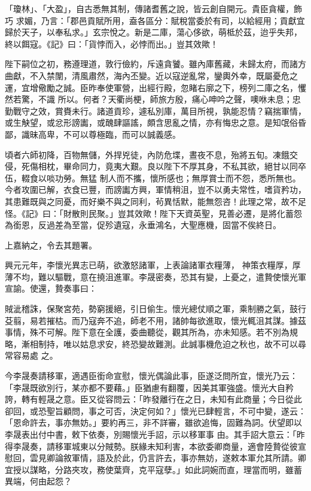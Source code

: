 \begin{pinyinscope}
 「瓊林」、「大盈」，自古悉無其制，傳諸耆舊之說，皆云創自開元。貴臣貪權，飾巧
 求媚，乃言：「郡邑貢賦所用，盍各區分：賦稅當委於有司，以給經用；貢獻宜歸於天子，以奉私求。」玄宗悅之。新是二庫，蕩心侈欲，萌柢於茲，迨乎失邦，終以餌寇。《記》曰：「貨悖而入，必悖而出。」豈其效歟！



 陛下嗣位之初，務遵理道，敦行儉約，斥遠貪饕。雖內庫舊藏，未歸太府，而諸方曲獻，不入禁闈，清風肅然，海內丕變。近以寇逆亂常，鑾輿外幸，既屬憂危之運，宜增儆勵之誠。臣昨奉使軍營，出經行殿，忽睹右廓之下，榜列二庫之名，戄然若驚，不識
 所以。何者？天衢尚梗，師旅方殷，痛心呻吟之聲，噢咻未息；忠勤戰守之效，賞賚未行。諸道貢珍，遽私別庫，萬目所視，孰能忍情？竊揣軍情，或生觖望，或忿形謗讟，或醜肆謳謠，頗含思亂之情，亦有悔忠之意。是知氓俗昏鄙，識昧高卑，不可以尊極臨，而可以誠義感。



 頃者六師初降，百物無儲，外捍兇徒，內防危堞，晝夜不息，殆將五旬。凍餓交侵，死傷相枕，畢命同力，竟夷大艱。良以陛下不厚其身，不私其欲，絕甘以同卒伍，輟食以啖功勞。無猛
 制人而不攜，懷所感也；無厚賞士而不怨，悉所無也。今者攻圍已解，衣食已豐，而謗讟方興，軍情稍沮，豈不以勇夫常性，嗜貨矜功，其患難既與之同憂，而好樂不與之同利，茍異恬默，能無怨咨！此理之常，故不足怪。《記》曰：「財散則民聚。」豈其效歟！陛下天資英聖，見善必遷，是將化蓄怨為銜恩，反過差為至當，促殄遺寇，永垂鴻名，大聖應機，固當不俟終日。



 上嘉納之，令去其題署。



 興元元年，李懷光異志已萌，欲激怒諸軍，上表論諸軍衣糧薄，
 神策衣糧厚，厚薄不均，難以驅戰，意在撓沮進軍。李晟密奏，恐其有變，上憂之，遣贄使懷光軍宣諭。使還，贄奏事曰：



 賊泚稽誅，保聚宮苑，勢窮援絕，引日偷生。懷光總仗順之軍，乘制勝之氣，鼓行芟翦，易若摧枯。而乃寇奔不追，師老不用，諸帥每欲進取，懷光輒沮其謀。據茲事情，殊不可解。陛下意在全護，委曲聽從，觀其所為，亦未知感。若不別為規略，漸相制持，唯以姑息求安，終恐變故難測。此誠事機危迫之秋也，故不可以尋常容易處
 之。



 今李晟奏請移軍，適遇臣銜命宣慰，懷光偶論此事，臣遂泛問所宜，懷光乃云：「李晟既欲別行，某亦都不要藉。」臣猶慮有翻覆，因美其軍強盛。懷光大自矜誇，轉有輕晟之意。臣又從容問云：「昨發離行在之日，未知有此商量；今日從此卻回，或恐聖旨顧問，事之可否，決定何如？」懷光已肆輕言，不可中變，遂云：「恩命許去，事亦無妨。」要約再三，非不詳審，雖欲追悔，固難為詞。伏望即以李晟表出付中書，敕下依奏，別賜懷光手詔，示以移軍事
 由。其手詔大意云：「昨得李晟奏，請移軍城東以分賊勢。朕緣未知利害，本欲委卿商量，適會陸贄從彼宣慰回，雲見卿論敘軍情，語及於此，仍言許去，事亦無妨，遂敕本軍允其所請。卿宜授以謀略，分路夾攻，務使葉齊，克平寇孽。」如此詞婉而直，理當而明，雖蓄異端，何由起怨？




\end{pinyinscope}
